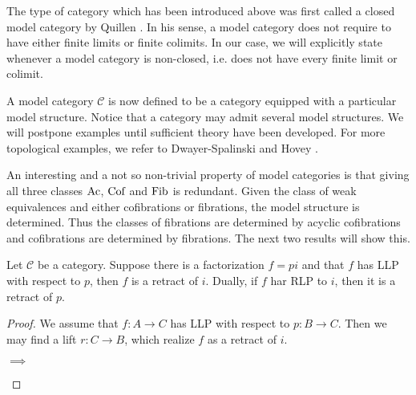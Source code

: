 \documentclass[../thesis.tex]{subfiles}
\begin{document}
            \begin{remark}
                The type of category which has been introduced above was first called a closed model category by Quillen \cite{Quillen67}. In his sense, a model category does not require to have either finite limits or finite colimits. In our case, we will explicitly state whenever a model category is non-closed, i.e. does not have every finite limit or colimit.
            \end{remark}

            A model category $\mathcal{C}$ is now defined to be a category equipped with a particular model structure. Notice that a category may admit several model structures. We will postpone examples until sufficient theory have been developed. For more topological examples, we refer to Dwayer-Spalinski \cite{Dwyer95} and Hovey \cite{Hovey99}.

            An interesting and a not so non-trivial property of model categories is that giving all three classes $\tt{Ac}$, $\tt{Cof}$ and $\tt{Fib}$ is redundant. Given the class of weak equivalences and either cofibrations or fibrations, the model structure is determined. Thus the classes of fibrations are determined by acyclic cofibrations and cofibrations are determined by fibrations. The next two results will show this.

            \begin{lemma}\label{lem: retract-argument}
                Let $\mathcal{C}$ be a category. Suppose there is a factorization $f = pi$ and that $f$ has LLP with respect to $p$, then $f$ is a retract of $i$. Dually, if $f$ har RLP to $i$, then it is a retract of $p$.
            \end{lemma}

            \begin{proof}
                We assume that $f : A \rightarrow C$ has LLP with respect to $p : B \rightarrow C$. Then we may find a lift $r : C \rightarrow B$, which realize $f$ as a retract of $i$.
                
                \begin{center}
                     $\implies$
                \end{center}
            \end{proof}
\end{document}
